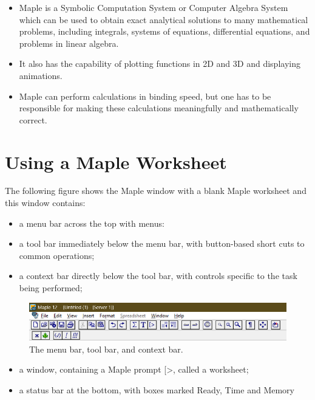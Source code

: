 \documentclass[
]{book}
\providecommand{\tightlist}{%
  \setlength{\itemsep}{0pt}\setlength{\parskip}{0pt}}
\theoremstyle{definition}
\theoremstyle{definition}
\theoremstyle{definition}
\theoremstyle{definition}
\theoremstyle{remark}
\begin{document}
\begin{itemize}
\tightlist
\item
  Maple is a Symbolic Computation System or Computer Algebra System which can be used to obtain exact analytical solutions to many mathematical problems, including integrals, systems of equations, differential equations, and problems in linear algebra.
\item
  It also has the capability of plotting functions in 2D and 3D and displaying animations.
\item
  Maple can perform calculations in binding speed, but one has to be responsible for making these calculations meaningfully and mathematically correct.
\end{itemize}

\section{Using a Maple Worksheet}\label{using-a-maple-worksheet-1}

The following figure shows the Maple window with a blank Maple worksheet and this window contains:

\begin{itemize}
\tightlist
\item
  a menu bar across the top with menus:
\item
  a tool bar immediately below the menu bar, with button-based short cuts to common operations;
\item
  a context bar directly below the tool bar, with controls specific to the task being performed;
\end{itemize}

\begin{figure}
\centering
\includegraphics{figures/Lesson 1/fig1.png}
\caption{The menu bar, tool bar, and context bar.}
\end{figure}

\begin{itemize}
\tightlist
\item
  a window, containing a Maple prompt {[}\textgreater, called a worksheet;
\item
  a status bar at the bottom, with boxes marked Ready, Time and Memory
\end{itemize}
\end{document}
